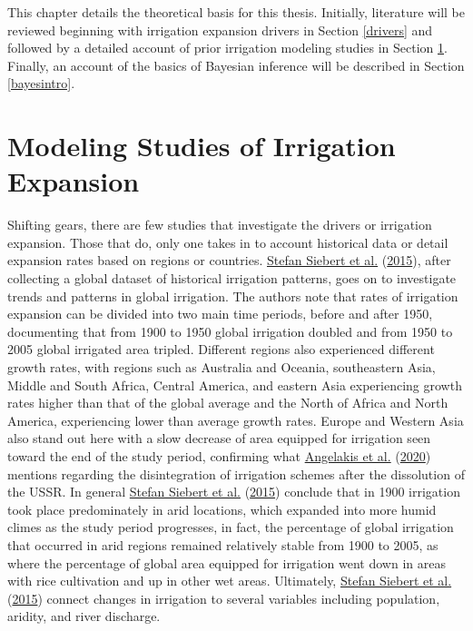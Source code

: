 \documentclass[12pt,twoside]{reedthesis}
\begin{document}
This chapter details the theoretical basis for this thesis. Initially, literature will be reviewed beginning with irrigation expansion drivers in Section \ref{drivers} and followed by a detailed account of prior irrigation modeling studies in Section \ref{irrmodslit}. Finally, an account of the basics of Bayesian inference will be described in Section \ref{bayesintro}.

\hypertarget{irrmodslit}{%
\section{Modeling Studies of Irrigation Expansion}\label{irrmodslit}}

Shifting gears, there are few studies that investigate the drivers or irrigation expansion. Those that do, only one takes in to account historical data or detail expansion rates based on regions or countries. \protect\hyperlink{ref-siebertGlobalDataSet2015}{Stefan Siebert et al.} (\protect\hyperlink{ref-siebertGlobalDataSet2015}{2015}), after collecting a global dataset of historical irrigation patterns, goes on to investigate trends and patterns in global irrigation. The authors note that rates of irrigation expansion can be divided into two main time periods, before and after 1950, documenting that from 1900 to 1950 global irrigation doubled and from 1950 to 2005 global irrigated area tripled. Different regions also experienced different growth rates, with regions such as Australia and Oceania, southeastern Asia, Middle and South Africa, Central America, and eastern Asia experiencing growth rates higher than that of the global average and the North of Africa and North America, experiencing lower than average growth rates. Europe and Western Asia also stand out here with a slow decrease of area equipped for irrigation seen toward the end of the study period, confirming what \protect\hyperlink{ref-angelakisIrrigationWorldAgricultural2020}{Angelakis et al.} (\protect\hyperlink{ref-angelakisIrrigationWorldAgricultural2020}{2020}) mentions regarding the disintegration of irrigation schemes after the dissolution of the USSR. In general \protect\hyperlink{ref-siebertGlobalDataSet2015}{Stefan Siebert et al.} (\protect\hyperlink{ref-siebertGlobalDataSet2015}{2015}) conclude that in 1900 irrigation took place predominately in arid locations, which expanded into more humid climes as the study period progresses, in fact, the percentage of global irrigation that occurred in arid regions remained relatively stable from 1900 to 2005, as where the percentage of global area equipped for irrigation went down in areas with rice cultivation and up in other wet areas. Ultimately, \protect\hyperlink{ref-siebertGlobalDataSet2015}{Stefan Siebert et al.} (\protect\hyperlink{ref-siebertGlobalDataSet2015}{2015}) connect changes in irrigation to several variables including population, aridity, and river discharge.
\end{document}
